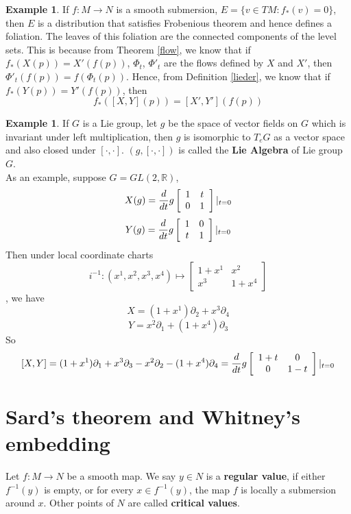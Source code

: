 \documentclass{article}
\theoremstyle{definition}
\newtheorem{exm}[thm]{Example}
\begin{document}
\begin{exm}
If $f: M\rightarrow N$ is a smooth submersion, $E=\{v\in TM: f_*(v)=0\}$, then $E$ is a distribution that satisfies Frobenious theorem and hence defines a foliation. The leaves of this foliation are the connected components of the level sets. This is because from Theorem \ref{flow}, we know that
if $f_*(X(p))=X'(f(p))$, $\Phi_t$, $\Phi'_t$ are the flows defined by $X$
 and $X'$, then $\Phi'_t(f(p))=f(\Phi_t(p))$. Hence, from Definition \ref{lieder}, we know that if $f_*(Y(p))=Y'(f(p))$, then
 \[f_*([X, Y](p))=[X', Y'](f(p))\]
 \end{exm}

\begin{exm}
    If $G$ is a Lie group, let $g$ be the space of vector fields on $G$ which is invariant under left multiplication, then $g$ is isomorphic to $T_eG$ as a vector space and also closed under $[\cdot, \cdot]$. $(g, [\cdot, \cdot])$ is called the {\bf Lie Algebra} of Lie group $G$.\\

    As an example, suppose $G=GL(2, \mathbb{R})$, 
    \[X(g)={d\over dt}g\left[\begin{array}{cc}1 & t\\ 0 & 1\end{array}\right]|_{t=0}\] \[Y(g)={d\over dt}g\left[\begin{array}{cc}1 & 0\\ t & 1\end{array}\right]|_{t=0}\]
    Then under local coordinate charts \[i^{-1}: (x^1, x^2, x^3, x^4)\mapsto \left[\begin{array}{cc}1+x^1 & x^2\\x^3 & 1+x^4\end{array}\right]\], we have
    \[X=(1+x^1)\partial_2+x^3\partial_4\]
    \[Y=x^2\partial_1+(1+x^4)\partial_3\]
    So
    \[[X, Y]=(1+x^1)\partial_1+x^3\partial_3-x^2\partial_2-(1+x^4)\partial_4={d\over dt}g\left[\begin{array}{cc}1+t & 0\\ 0 & 1-t\end{array}\right]|_{t=0}\]
\end{exm}

\newpage

\section{Sard's theorem and Whitney's embedding}

Let $f: M\rightarrow N$ be a smooth map. We say $y\in N$ is a {\bf regular value}, if either $f^{-1}(y)$ is empty, or for every $x\in f^{-1}(y)$, the map $f$ is locally a submersion around $x$. Other points of $N$ are called {\bf critical values}.\\
\end{document}
